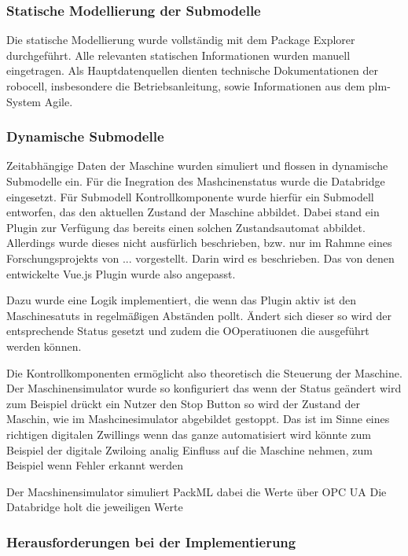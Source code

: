 \subsubsection{Statische Modellierung der Submodelle}

Die statische Modellierung wurde vollständig mit dem Package Explorer durchgeführt. 
Alle relevanten statischen Informationen wurden manuell eingetragen. 
Als Hauptdatenquellen dienten technische Dokumentationen der robocell, insbesondere die Betriebsanleitung, sowie Informationen aus dem \acs{plm}-System Agile.


\subsubsection{Dynamische Submodelle}

Zeitabhängige Daten der Maschine wurden simuliert und flossen in dynamische Submodelle ein.
Für die Inegration des Mashcinenstatus wurde die Databridge eingesetzt.
Für Submodell Kontrollkomponente wurde hierfür ein Submodell entworfen, das den aktuellen Zustand der Maschine abbildet.
Dabei stand ein Plugin zur Verfügung das bereits einen solchen Zustandsautomat abbildet.
Allerdings wurde dieses nicht ausfürlich beschrieben, bzw. nur im Rahmne eines Forschungsprojekts von ... vorgestellt.
Darin wird es beschrieben.
Das von denen entwickelte Vue.js Plugin wurde also angepasst.

Dazu wurde eine Logik implementiert, die wenn das Plugin aktiv ist den Maschinesatuts in regelmäßigen Abständen pollt.
Ändert sich dieser so wird der entsprechende Status gesetzt und zudem die OOperatiuonen die ausgeführt werden können.

Die Kontrollkomponenten ermöglicht also theoretisch die Steuerung der Maschine.
Der Maschinensimulator wurde so konfiguriert das wenn der Status geändert wird zum Beispiel drückt ein Nutzer den Stop Button so wird der Zustand der Maschin, wie im Mashcinesimulator abgebildet gestoppt.
Das ist im Sinne eines richtigen digitalen Zwillings wenn das ganze automatisiert wird könnte zum Beispiel der digitale Zwiloing analig Einfluss auf die Maschine nehmen, zum Beispiel wenn Fehler erkannt werden



Der Macshinensimulator simuliert PackML dabei die Werte über OPC UA
Die Databridge holt die jeweiligen Werte

\subsubsection{Herausforderungen bei der Implementierung}

